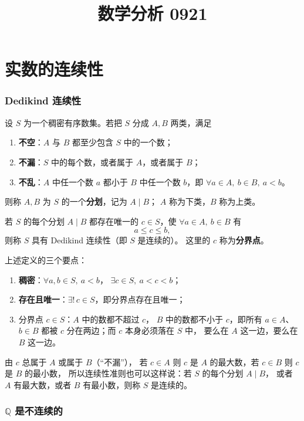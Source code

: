 \documentclass[UTF8,11pt]{ctexart}
\title{数学分析 0921}
\date{}
\theoremstyle{cnthm}
\begin{document}
\maketitle

\section{实数的连续性}

\subsubsection*{Dedikind 连续性}

设 $S$ 为一个稠密有序数集。若把 $S$ 分成 $A,B$ 两类，满足

\begin{enumerate}
\item[(i)] \textbf{不空}：$A$ 与 $B$ 都至少包含 $S$ 中的一个数；
\item[(ii)] \textbf{不漏}：$S$ 中的每个数，或者属于 $A$，或者属于 $B$；
\item[(iii)] \textbf{不乱}：$A$ 中任一个数 $a$ 都小于 $B$ 中任一个数 $b$，即
$\forall a\in A,\ b\in B,\ a<b$。
\end{enumerate}

则称 $A,B$ 为 $S$ 的一个\textbf{分划}，记为 $A\mid B$；
$A$ 称为下类，$B$ 称为上类。

若 $S$ 的每个分划 $A\mid B$ 都存在唯一的 $c\in S$，使
$\forall a\in A,\ b\in B$ 有
\[
a\leq c\leq b,
\]
则称 $S$ 具有 Dedikind 连续性（即 $S$ 是连续的）。
这里的 $c$ 称为\textbf{分界点}。

上述定义的三个要点：

\begin{enumerate}
\item \textbf{稠密}：$\forall a,b\in S,\ a<b$，
$\exists c\in S,\ a<c<b$；
\item \textbf{存在且唯一}：$\exists!\,c\in S$，即分界点存在且唯一；
\item 分界点 $c\in S$：$A$ 中的数都不超过 $c$，
$B$ 中的数都不小于 $c$，即所有 $a\in A$、$b\in B$ 都被
$c$ 分在两边；而 $c$ 本身必须落在 $S$ 中，
要么在 $A$ 这一边，要么在 $B$ 这一边。
\end{enumerate}

由 $c$ 总属于 $A$ 或属于 $B$（“不漏”），
若 $c\in A$ 则 $c$ 是 $A$ 的最大数，若 $c\in B$ 则 $c$ 是 $B$ 的最小数，
所以连续性准则也可以这样说：若 $S$ 的每个分划 $A\mid B$，
或者 $A$ 有最大数，或者 $B$ 有最小数，则称 $S$ 是连续的。

\subsubsection*{$\mathbb Q$ 是不连续的}
\end{document}
